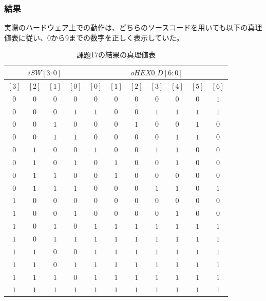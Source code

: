 \documentclass[a4paper]{jarticle}
\begin{document}
\subsubsection{結果}
実際のハードウェア上での動作は、どちらのソースコードを用いても以下の真理値表に従い、0から9までの数字を正しく表示していた。
\begin{table}[!h]
	\begin{center}
		\caption{課題17の結果の真理値表}
		\label{Work17TruthTable}
		\begin{tabular}{|c|c|c|c||c|c|c|c|c|c|c|}
			\hline
			\multicolumn{4}{|c|}{$iSW \left[ 3:0 \right]$}							&\multicolumn{7}{|c|}{$oHEX0\_D \left[ 6:0 \right]$}															\\	\hline
			$\left[ 3 \right]$	&$\left[ 2 \right]$	&$\left[ 1 \right]$	&$\left[ 0 \right]$	&$\left[ 0 \right]$	&$\left[ 1 \right]$	&$\left[ 2 \right]$	&$\left[ 3 \right]$	&$\left[ 4 \right]$	&$\left[ 5 \right]$	&$\left[ 6 \right]$	\\	\hline\hline
			$0$			&$0$			&$0$			&$0$			&$0$			&$0$			&$0$			&$0$			&$0$			&$0$			&$1$			\\	\hline
			$0$			&$0$			&$0$			&$1$			&$1$			&$0$			&$0$			&$1$			&$1$			&$1$			&$1$			\\	\hline
			$0$			&$0$			&$1$			&$0$			&$0$			&$0$			&$1$			&$0$			&$0$			&$1$			&$0$			\\	\hline
			$0$			&$0$			&$1$			&$1$			&$0$			&$0$			&$0$			&$0$			&$1$			&$1$			&$0$			\\	\hline
			$0$			&$1$			&$0$			&$0$			&$1$			&$0$			&$0$			&$1$			&$1$			&$0$			&$0$			\\	\hline
			$0$			&$1$			&$0$			&$1$			&$0$			&$1$			&$0$			&$0$			&$1$			&$0$			&$0$			\\	\hline
			$0$			&$1$			&$1$			&$0$			&$0$			&$1$			&$0$			&$0$			&$0$			&$0$			&$0$			\\	\hline
			$0$			&$1$			&$1$			&$1$			&$0$			&$0$			&$0$			&$1$			&$1$			&$0$			&$1$			\\	\hline
			$1$			&$0$			&$0$			&$0$			&$0$			&$0$			&$0$			&$0$			&$0$			&$0$			&$0$			\\	\hline
			$1$			&$0$			&$0$			&$1$			&$0$			&$0$			&$0$			&$0$			&$1$			&$0$			&$0$			\\	\hline
			$1$			&$0$			&$1$			&$0$			&$1$			&$1$			&$1$			&$1$			&$1$			&$1$			&$1$			\\	\hline
			$1$			&$0$			&$1$			&$1$			&$1$			&$1$			&$1$			&$1$			&$1$			&$1$			&$1$			\\	\hline
			$1$			&$1$			&$0$			&$0$			&$1$			&$1$			&$1$			&$1$			&$1$			&$1$			&$1$			\\	\hline
			$1$			&$1$			&$0$			&$1$			&$1$			&$1$			&$1$			&$1$			&$1$			&$1$			&$1$			\\	\hline
			$1$			&$1$			&$1$			&$0$			&$1$			&$1$			&$1$			&$1$			&$1$			&$1$			&$1$			\\	\hline
			$1$			&$1$			&$1$			&$1$			&$1$			&$1$			&$1$			&$1$			&$1$			&$1$			&$1$			\\	\hline
		\end{tabular}
	\end{center}
\end{table}
\end{document}
